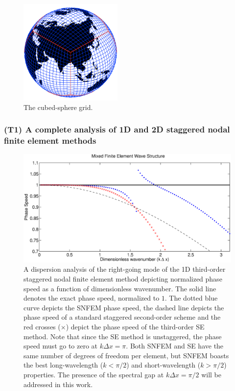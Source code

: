 \documentclass[11pt]{article}
\begin{document}
\begin{figure}
\begin{center}
\includegraphics[width=2in]{A_CubedSphere}
\end{center}
\caption{The cubed-sphere grid.} \label{fig:CubedSphere}
\end{figure}

\subsubsection{(T1) A complete analysis of 1D and 2D staggered nodal finite element methods} \label{sec:AnalysisSNFEM}

\begin{figure}
\begin{center}
\includegraphics[width=5in]{HFEM_ThirdOrder}
\end{center}
\caption{A dispersion analysis of the right-going mode of the 1D third-order staggered nodal finite element method depicting normalized phase speed as a function of dimensionless wavenumber.  The solid line denotes the exact phase speed, normalized to $1$.  The dotted blue curve depicts the SNFEM phase speed, the dashed line depicts the phase speed of a standard staggered second-order scheme and the red crosses ($\times$) depict the phase speed of the third-order SE method.  Note that since the SE method is unstaggered, the phase speed must go to zero at $k \Delta x = \pi$.  Both SNFEM and SE have the same number of degrees of freedom per element, but SNFEM boasts the best long-wavelength ($k < \pi/2$) and short-wavelength ($k > \pi/2$) properties.  The presence of the spectral gap at $k \Delta x = \pi / 2$ will be addressed in this work.} \label{fig:SNFEMEigenstructure}
\end{figure}
\end{document}
